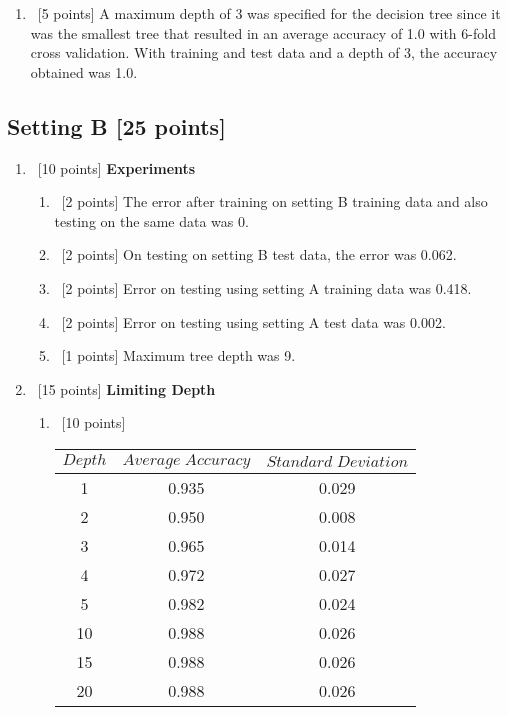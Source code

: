 \begin{enumerate}
\begin{enumerate}
  \item ~[5 points]  A maximum depth of 3 was specified for the decision tree since it was the smallest tree that resulted in an average accuracy of 1.0 with 6-fold cross validation. With training and test data and a depth of 3, the accuracy obtained was 1.0.
  \end{enumerate}

\end{enumerate}

\subsection*{Setting B [25 points]}

\begin{enumerate}
\item ~[10 points] \textbf{Experiments}
  
  \begin{enumerate}
    
  \item ~[2 points]  The error after training on setting B training data and also testing on the same data was 0. 
    
  \item ~[2 points] On testing on setting B test data, the error was 0.062. 
    
  \item ~[2 points] Error on testing using setting A training data was 0.418.
    
  \item ~[2 points] Error on testing using setting A test data was 0.002.
    
  \item ~[1 points] Maximum tree depth was 9.
  \end{enumerate}
  
\item ~[15 points] \textbf{Limiting Depth}
  
  \begin{enumerate}
  \item ~[10 points] 
  
      \begin{center}
    \begin{tabular}{c|c|c}
      $Depth$ & $Average \; Accuracy$ & $Standard \;Deviation$\\ \hline
      1 & 0.935 & 0.029 \\
      2 &  0.950 & 0.008\\
       3 & 0.965 & 0.014\\
       4 & 0.972 & 0.027\\
       5 & 0.982 & 0.024\\
       10 &0.988 & 0.026\\
      15 & 0.988 & 0.026\\
      20 & 0.988 & 0.026
    \end{tabular}
  \end{center}
  

\end{enumerate}
\end{enumerate}
